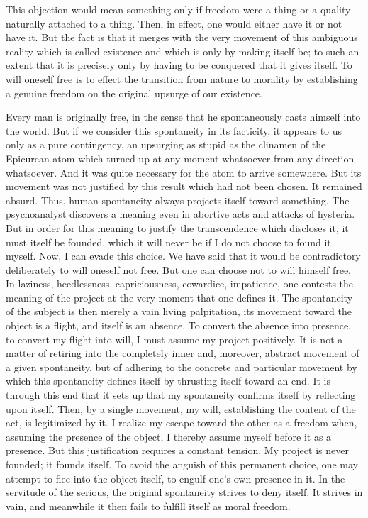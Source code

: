 \documentclass[11pt]{article}
\begin{document}
This objection would mean something only if freedom were a thing or a quality naturally attached to a thing. Then, in effect, one would either have it or not have it. But the fact is that it merges with the very movement of this ambiguous reality which is called existence and which is only by making itself be; to such an extent that it is precisely only by having to be conquered that it gives itself. To will oneself free is to effect the transition from nature to morality by establishing a genuine freedom on the original upsurge of our existence.

Every man is originally free, in the sense that he spontaneously casts himself into the world. But if we consider this spontaneity in its facticity, it appears to us only as a pure contingency, an upsurging as stupid as the clinamen of the Epicurean atom which turned up at any moment whatsoever from any direction whatsoever. And it was quite necessary for the atom to arrive somewhere. But its movement was not justified by this result which had not been chosen. It remained absurd. Thus, human spontaneity always projects itself toward something. The psychoanalyst discovers a meaning even in abortive acts and attacks of hysteria. But in order for this meaning to justify the transcendence which discloses it, it must itself be founded, which it will never be if I do not choose to found it myself. Now, I can evade this choice. We have said that it would be contradictory deliberately to will oneself not free. But one can choose not to will himself free. In laziness, heedlessness, capriciousness, cowardice, impatience, one contests the meaning of the project at the very moment that one defines it. The spontaneity of the subject is then merely a vain living palpitation, its movement toward the object is a flight, and itself is an absence. To convert the absence into presence, to convert my flight into will, I must assume my project positively. It is not a matter of retiring into the completely inner and, moreover, abstract movement of a given spontaneity, but of adhering to the concrete and particular movement by which this spontaneity defines itself by thrusting itself toward an end. It is through this end that it sets up that my spontaneity confirms itself by reflecting upon itself. Then, by a single movement, my will, establishing the content of the act, is legitimized by it. I realize my escape toward the other as a freedom when, assuming the presence of the object, I thereby assume myself before it as a presence. But this justification requires a constant tension. My project is never founded; it founds itself. To avoid the anguish of this permanent choice, one may attempt to flee into the object itself, to engulf one’s own presence in it. In the servitude of the serious, the original spontaneity strives to deny itself. It strives in vain, and meanwhile it then fails to fulfill itself as moral freedom.
\end{document}
